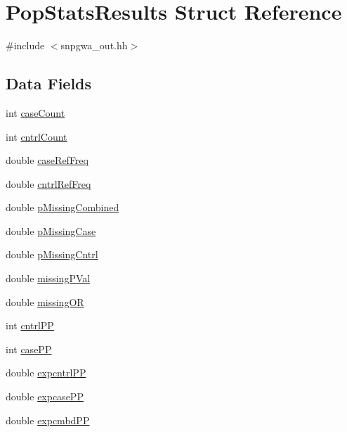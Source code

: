 \hypertarget{structPopStatsResults}{
\section{PopStatsResults Struct Reference}
\label{structPopStatsResults}
}


{\ttfamily \#include $<$snpgwa\_\-out.hh$>$}

\subsection*{Data Fields}
\begin{DoxyCompactItemize}
\item 
int \hyperlink{structPopStatsResults_a43f4b5b1fec3ff6347e140f140a56f80}{caseCount}
\item 
int \hyperlink{structPopStatsResults_a63f8df1c8415a68dec65efe61c45553f}{cntrlCount}
\item 
double \hyperlink{structPopStatsResults_ad1754c25a1c546fe7175b46c763aeac9}{caseRefFreq}
\item 
double \hyperlink{structPopStatsResults_a371643c7d37e3f9497323a9df6ce1db9}{cntrlRefFreq}
\item 
double \hyperlink{structPopStatsResults_a90c1d1e0d9342db630347c9d29c1cb99}{pMissingCombined}
\item 
double \hyperlink{structPopStatsResults_afde7ddd5cc992a5ef18330d6263e2369}{pMissingCase}
\item 
double \hyperlink{structPopStatsResults_a5d24ec37813555025b0ea26ac43cf6f7}{pMissingCntrl}
\item 
double \hyperlink{structPopStatsResults_a24ddefc14228bb197db10dd944445ba2}{missingPVal}
\item 
double \hyperlink{structPopStatsResults_ab469e705764619038c5d65c8ea4af532}{missingOR}
\item 
int \hyperlink{structPopStatsResults_a3319661bd81bea9c95ecdde6c1bd0036}{cntrlPP}
\item 
int \hyperlink{structPopStatsResults_a47ed24bab69a1b7a65c298cdb1c97117}{casePP}
\item 
double \hyperlink{structPopStatsResults_abadeb20f7bfd4f6c91ea62bb9bd2b3d3}{expcntrlPP}
\item 
double \hyperlink{structPopStatsResults_a930a62c0311f01dd3878e0f361bdacdd}{expcasePP}
\item 
double \hyperlink{structPopStatsResults_afb1018a227cacfadf8571389767d82b5}{expcmbdPP}
\item 

\end{DoxyCompactItemize}

